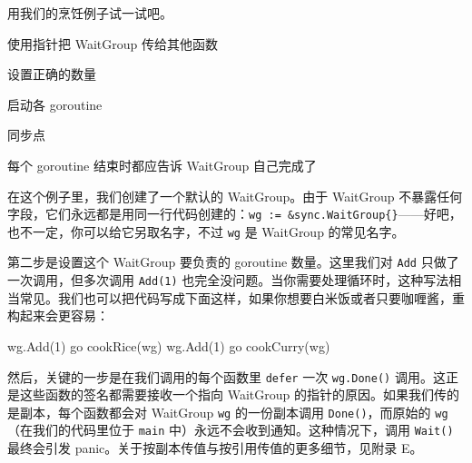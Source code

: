 用我们的烹饪例子试一试吧。


\begin{codeannotations}
\item 使用指针把 WaitGroup 传给其他函数
\item 设置正确的数量
\item 启动各 goroutine
\item 同步点
\item 每个 goroutine 结束时都应告诉 WaitGroup 自己完成了
\end{codeannotations}

在这个例子里，我们创建了一个默认的 WaitGroup。由于 WaitGroup 不暴露任何字段，它们永远都是用同一行代码创建的：\texttt{wg := \&sync.WaitGroup\{\}}——好吧，也不一定，你可以给它另取名字，不过 \texttt{wg} 是 WaitGroup 的常见名字。

第二步是设置这个 WaitGroup 要负责的 goroutine 数量。这里我们对 \texttt{Add} 只做了一次调用，但多次调用 \texttt{Add(1)} 也完全没问题。当你需要处理循环时，这种写法相当常见。我们也可以把代码写成下面这样，如果你想要白米饭或者只要咖喱酱，重构起来会更容易：

\begin{gocode}[]
wg.Add(1)
go cookRice(wg)
wg.Add(1)
go cookCurry(wg)
\end{gocode}

然后，关键的一步是在我们调用的每个函数里 \texttt{defer} 一次 \texttt{wg.Done()} 调用。这正是这些函数的签名都需要接收一个指向 WaitGroup 的指针的原因。如果我们传的是副本，每个函数都会对 WaitGroup \texttt{wg} 的一份副本调用 \texttt{Done()}，而原始的 \texttt{wg}（在我们的代码里位于 \texttt{main} 中）永远不会收到通知。这种情况下，调用 \texttt{Wait()} 最终会引发 panic。关于按副本传值与按引用传值的更多细节，见附录 E。

